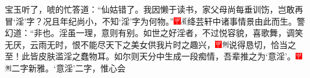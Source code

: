 宝玉听了，唬的忙答道：“仙姑错了。我因懒于读书，家父母尚每垂训饬，岂敢再冒‘淫’字？况且年纪尚小，不知‘淫’字为何物。”{\includegraphics[width=3mm]{../Images/00002}\includegraphics[width=3mm]{../Images/00010}\footnotesize \kaishu 绛芸轩中诸事情景由此而生。}警幻道：“非也。淫虽一理，意则有别。如世之好淫者，不过悦容貌，喜歌舞，调笑无厌，云雨无时，恨不能尽天下之美女供我片时之趣兴，{\includegraphics[width=3mm]{../Images/00002}\includegraphics[width=3mm]{../Images/00011}\footnotesize \kaishu 说得恳切，恰当之至！}此皆皮肤滥淫之蠢物耳。如尔则天分中生成一段痴情，吾辈推之为‘意淫’。{\includegraphics[width=3mm]{../Images/00002}\includegraphics[width=3mm]{../Images/00011}\footnotesize \kaishu 二字新雅。}‘意淫’二字，惟心会